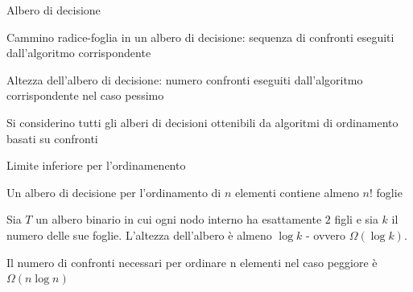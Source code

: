 \begin{frame}{Albero di decisione}
	
\vspace{-9pt}
\begin{myboxtitle}[Proprietà]
\BI
\item \alert{Cammino radice-foglia in un albero di decisione}: sequenza di confronti eseguiti dall'algoritmo corrispondente
\item \alert{Altezza dell'albero di decisione}: numero confronti eseguiti dall'algoritmo corrispondente nel caso pessimo
\EI
\end{myboxtitle}

\bigskip
Si considerino tutti gli alberi di decisioni ottenibili da algoritmi di ordinamento basati su confronti

\end{frame}%

\begin{frame}{Limite inferiore per l'ordinamenento}

\vspace{-9pt}
\begin{myboxtitle}[Lemma 1]
Un albero di decisione per l'ordinamento di $n$ elementi contiene almeno $n!$ foglie
\end{myboxtitle}

\begin{myboxtitle}[Lemma 2]
Sia $T$ un albero binario in cui ogni nodo interno ha esattamente $2$ figli e sia $k$ il numero delle sue foglie. 
L'altezza dell'albero è almeno $\log k$ - ovvero $\Omega(\log k)$.
\end{myboxtitle}

\begin{myboxtitle}[Teorema]
Il numero di confronti necessari per ordinare n elementi nel caso peggiore è $\Omega(n \log n)$
\end{myboxtitle}

\end{frame}%


